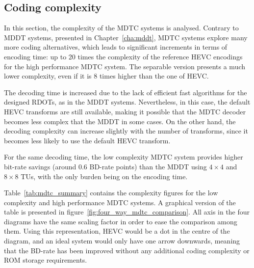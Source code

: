 \documentclass[11pt,a4paper,openright,twoside]{book}
\numberwithin{equation}{section} %
\numberwithin{figure}{section} %
\numberwithin{table}{section} %
\begin{document}
\subsection{Coding complexity}
\label{sub:mdtc_coding_complexity}

In this section, the complexity of the \ac{MDTC} systems is analysed.
Contrary to \ac{MDDT} systems, presented in Chapter~\ref{cha:mddt}, \ac{MDTC}
systems explore many more coding alternatives, which leads to significant
increments in terms of encoding time:
up to 20 times the complexity of the reference \ac{HEVC} encodings for the
high performance \acs{MDTC} system.
The separable version presents a much lower complexity, even if it is 8
times higher than the one of \ac{HEVC}.

The decoding time is increased due to the lack of efficient fast algorithms
for the designed \acp{RDOT}, as in the \ac{MDDT} systems.
Nevertheless, in this case, the default \ac{HEVC} transforms are still
available, making it possible that the \ac{MDTC} decoder becomes less complex
that the \ac{MDDT} in some cases.
On the other hand, the decoding complexity can increase slightly with the
number of transforms, since it becomes less likely to use the default
\ac{HEVC} transform.

For the same decoding time, the low complexity \ac{MDTC} system provides
higher bit-rate savings (around 0.6 \ac{BD}-rate points) than the \ac{MDDT}
using $4\times4$ and $8\times8$ \acp{TU}, with the only burden being on the
encoding time.

Table~\ref{tab:mdtc_summary} contains the complexity figures for the low
complexity and high performance \ac{MDTC} systems.
A graphical version of the table is presented in
figure~\ref{fig:four_way_mdtc_comparison}.
All axis in the four diagrams have the same scaling factor in order to ease
the comparison among them.
Using this representation, \acs{HEVC} would be a dot in the centre of the
diagram, and an ideal system would only have one arrow downwards, meaning that
the \acs{BD}-rate has been improved without any additional coding complexity
or \acs{ROM} storage requirements.
\end{document}

